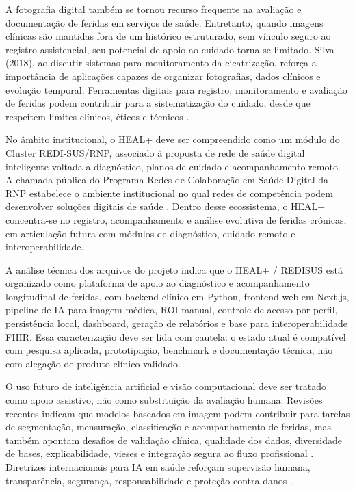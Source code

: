 \documentclass[
    12pt,
    oneside,
    a4paper,
    chapter=TITLE,
    brazil,
    sumario=tradicional,
    hidelinks
]{abntex2}
\begin{document}
A fotografia digital também se tornou recurso frequente na avaliação e documentação de feridas em serviços de saúde. Entretanto, quando imagens clínicas são mantidas fora de um histórico estruturado, sem vínculo seguro ao registro assistencial, seu potencial de apoio ao cuidado torna-se limitado. Silva (2018), ao discutir sistemas para monitoramento da cicatrização, reforça a importância de aplicações capazes de organizar fotografias, dados clínicos e evolução temporal. Ferramentas digitais para registro, monitoramento e avaliação de feridas podem contribuir para a sistematização do cuidado, desde que respeitem limites clínicos, éticos e técnicos \cite{medeiros2021}.

No âmbito institucional, o HEAL+ deve ser compreendido como um módulo do Cluster REDI-SUS/RNP, associado à proposta de rede de saúde digital inteligente voltada a diagnóstico, planos de cuidado e acompanhamento remoto. A chamada pública do Programa Redes de Colaboração em Saúde Digital da RNP estabelece o ambiente institucional no qual redes de competência podem desenvolver soluções digitais de saúde \cite{rnp2025}. Dentro desse ecossistema, o HEAL+ concentra-se no registro, acompanhamento e análise evolutiva de feridas crônicas, em articulação futura com módulos de diagnóstico, cuidado remoto e interoperabilidade.

A análise técnica dos arquivos do projeto indica que o HEAL+ / REDISUS está organizado como plataforma de apoio ao diagnóstico e acompanhamento longitudinal de feridas, com backend clínico em Python, frontend web em Next.js, pipeline de IA para imagem médica, ROI manual, controle de acesso por perfil, persistência local, dashboard, geração de relatórios e base para interoperabilidade FHIR. Essa caracterização deve ser lida com cautela: o estado atual é compatível com pesquisa aplicada, prototipação, benchmark e documentação técnica, não com alegação de produto clínico validado.

O uso futuro de inteligência artificial e visão computacional deve ser tratado como apoio assistivo, não como substituição da avaliação humana. Revisões recentes indicam que modelos baseados em imagem podem contribuir para tarefas de segmentação, mensuração, classificação e acompanhamento de feridas, mas também apontam desafios de validação clínica, qualidade dos dados, diversidade de bases, explicabilidade, vieses e integração segura ao fluxo profissional \cite{anisuzzaman2022,dabas2023}. Diretrizes internacionais para IA em saúde reforçam supervisão humana, transparência, segurança, responsabilidade e proteção contra danos \cite{who2021,who2023}.
\end{document}
